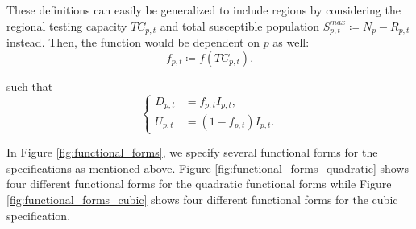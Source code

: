 \documentclass[12pt]{article}
\begin{document}
	These definitions can easily be generalized to include regions by considering the regional testing capacity $TC_{p,t}$ and total susceptible population $S^{max}_{p,t} \coloneqq N_p - R_{p,t}$ instead. Then, the function would be dependent on $p$ as well: 
	\begin{equation} \label{eq:f_rt}
	    f_{p,t} \coloneqq f(TC_{p,t}).
	\end{equation}
	
	\noindent such that
	\begin{equation*}
	    \begin{cases}
	        D_{p,t} &= f_{p,t} I_{p,t}, \\
	        U_{p,t} &= (1-f_{p,t}) I_{p,t}.
	    \end{cases}
	\end{equation*}
	
	In Figure \ref{fig:functional_forms}, we specify several functional forms for the specifications as mentioned above. Figure \ref{fig:functional_forms_quadratic} shows four different functional forms for the quadratic functional forms while Figure \ref{fig:functional_forms_cubic} shows four different functional forms for the cubic specification.
	\\
	
	\def\N{100}
	\def\fmin{0.1}
	
\end{document}
